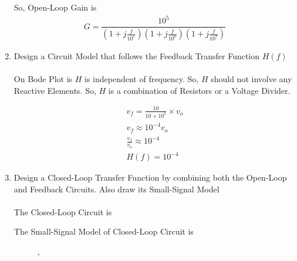 \begin{enumerate}[label=\thesubsection.\arabic*.,ref=\thesubsection.\theenumi]
So, Open-Loop Gain is
\begin{align}
G = \dfrac{10^5}{\left(1+j\frac{f}{10^{5}}\right)\left(1+j\frac{f}{10^{6}}\right)\left(1+j\frac{f}{10^{7}}\right)}
\end{align}

\item Design a Circuit Model that follows the Feedback Transfer Function $H(f)$\\
\solution\\
On Bode Plot is $H$ is independent of frequency. So, $H$  should not involve any Reactive Elements. So, $H$ is a combination of Resistors or a Voltage Divider.
\begin{figure}[ht!]
	\begin{center}
		\resizebox{\columnwidth/2}{!}{}
	\end{center}
	\caption{}
	\label{fig:Circuit}
\end{figure}

\begin{align}
v_{f} = \frac{10}{10 + 10^{5}} \times v_{o}\\
v_{f} \approx 10^{-4} v_{o}\\
\frac{v_{f}}{v_{o}} \approx 10^{-4}\\
H(f) = 10^{-4}
\end{align}

\item  Design a Closed-Loop Transfer Function by combining both the Open-Loop and Feedback Circuits. Also draw its Small-Signal Model\\
\solution\\
The Closed-Loop Circuit is
\begin{figure}[ht!]
	\begin{center}
		\resizebox{\columnwidth}{!}{}
	\end{center}
	\caption{}
	\label{fig:Closed-Loop Circuit}
\end{figure}

The Small-Signal Model of Closed-Loop Circuit is
\begin{figure}[ht!]
	\begin{center}
		\resizebox{\columnwidth}{!}{}
	\end{center},
	\caption{}
	\label{fig:Closed-Loop Small-Signal Circuit}
\end{figure}


\end{enumerate}
